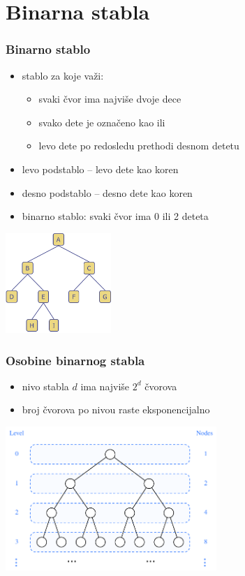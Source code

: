 \documentclass[compress,aspectratio=169]{beamer}
\begin{document}
\section[2-Stablo]{Binarna stabla}
\begin{frame}[fragile]
  \frametitle{Binarno stablo}
  \begin{itemize}
    \item stablo za koje važi:
    \begin{itemize}
      \item svaki čvor ima najviše dvoje dece
      \item svako dete je označeno kao  ili 
      \item levo dete po redosledu prethodi desnom detetu 
    \end{itemize}
    \item levo podstablo -- levo dete kao koren
    \item desno podstablo -- desno dete kao koren
    \item {} binarno stablo: svaki čvor ima 0 ili 2 deteta
  \end{itemize}
  \begin{center}
    \includegraphics[width=4cm]{asp-08-pic07.png}
  \end{center}
\end{frame}

\begin{frame}[fragile]
  \frametitle{Osobine binarnog stabla}
  \begin{itemize}
    \item nivo stabla $d$ ima najviše $2^d$ čvorova
    \item broj čvorova po nivou raste eksponencijalno
  \end{itemize}
  \begin{center}
    \includegraphics[width=8cm]{asp-08-pic08.pdf}
  \end{center}
\end{frame}
\end{document}
